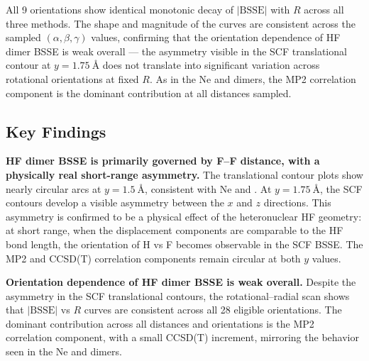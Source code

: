 \clearpage

All 9 orientations show identical monotonic decay of $|\text{BSSE}|$
with $R$ across all three methods. The shape and magnitude of the
curves are consistent across the sampled $(\alpha, \beta, \gamma)$
values, confirming that the orientation dependence of HF dimer BSSE
is weak overall --- the asymmetry visible in the SCF translational
contour at $y = \SI{1.75}{\angstrom}$ does not translate into
significant variation across rotational orientations at fixed $R$.
As in the Ne and  dimers, the MP2 correlation component is
the dominant contribution at all distances sampled.



\subsection{Key Findings}

\begin{finding_box}
\textbf{HF dimer BSSE is primarily governed by F--F distance, with a
physically real short-range asymmetry.}
The translational contour plots show nearly circular arcs at
$y = \SI{1.5}{\angstrom}$, consistent with Ne and . At
$y = \SI{1.75}{\angstrom}$, the SCF contours develop a visible
asymmetry between the $x$ and $z$ directions. This asymmetry is
confirmed to be a physical effect of the heteronuclear HF geometry:
at short range, when the displacement components are comparable to
the HF bond length, the orientation of H vs F becomes observable in
the SCF BSSE. The MP2 and CCSD(T) correlation components remain
circular at both $y$ values.
\end{finding_box}

\begin{finding_box}
\textbf{Orientation dependence of HF dimer BSSE is weak overall.}
Despite the asymmetry in the SCF translational contours, the
rotational--radial scan shows that $|\text{BSSE}|$ vs $R$ curves are
consistent across all 28 eligible orientations. The dominant
contribution across all distances and orientations is the MP2
correlation component, with a small CCSD(T) increment, mirroring the
behavior seen in the Ne and  dimers.
\end{finding_box}

\clearpage